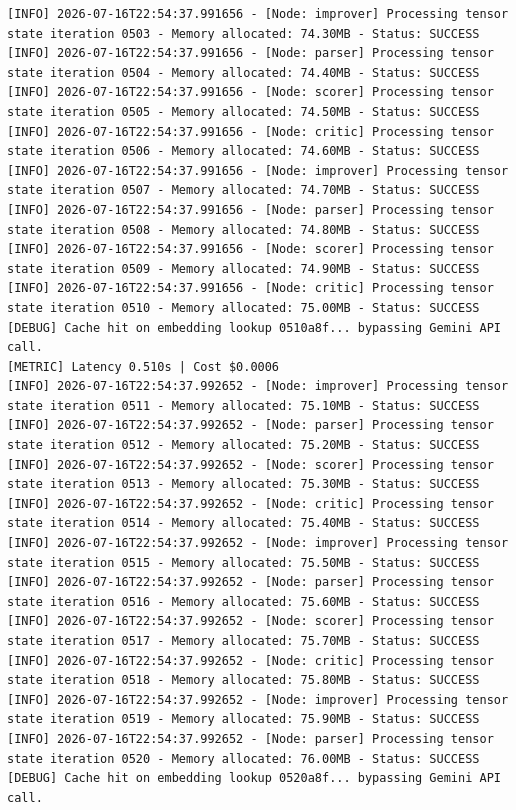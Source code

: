 \documentclass[10pt,journal,compsoc]{IEEEtran}
\begin{document}
\begin{verbatim}
[INFO] 2026-07-16T22:54:37.991656 - [Node: improver] Processing tensor state iteration 0503 - Memory allocated: 74.30MB - Status: SUCCESS
[INFO] 2026-07-16T22:54:37.991656 - [Node: parser] Processing tensor state iteration 0504 - Memory allocated: 74.40MB - Status: SUCCESS
[INFO] 2026-07-16T22:54:37.991656 - [Node: scorer] Processing tensor state iteration 0505 - Memory allocated: 74.50MB - Status: SUCCESS
[INFO] 2026-07-16T22:54:37.991656 - [Node: critic] Processing tensor state iteration 0506 - Memory allocated: 74.60MB - Status: SUCCESS
[INFO] 2026-07-16T22:54:37.991656 - [Node: improver] Processing tensor state iteration 0507 - Memory allocated: 74.70MB - Status: SUCCESS
[INFO] 2026-07-16T22:54:37.991656 - [Node: parser] Processing tensor state iteration 0508 - Memory allocated: 74.80MB - Status: SUCCESS
[INFO] 2026-07-16T22:54:37.991656 - [Node: scorer] Processing tensor state iteration 0509 - Memory allocated: 74.90MB - Status: SUCCESS
[INFO] 2026-07-16T22:54:37.991656 - [Node: critic] Processing tensor state iteration 0510 - Memory allocated: 75.00MB - Status: SUCCESS
[DEBUG] Cache hit on embedding lookup 0510a8f... bypassing Gemini API call.
[METRIC] Latency 0.510s | Cost $0.0006
[INFO] 2026-07-16T22:54:37.992652 - [Node: improver] Processing tensor state iteration 0511 - Memory allocated: 75.10MB - Status: SUCCESS
[INFO] 2026-07-16T22:54:37.992652 - [Node: parser] Processing tensor state iteration 0512 - Memory allocated: 75.20MB - Status: SUCCESS
[INFO] 2026-07-16T22:54:37.992652 - [Node: scorer] Processing tensor state iteration 0513 - Memory allocated: 75.30MB - Status: SUCCESS
[INFO] 2026-07-16T22:54:37.992652 - [Node: critic] Processing tensor state iteration 0514 - Memory allocated: 75.40MB - Status: SUCCESS
[INFO] 2026-07-16T22:54:37.992652 - [Node: improver] Processing tensor state iteration 0515 - Memory allocated: 75.50MB - Status: SUCCESS
[INFO] 2026-07-16T22:54:37.992652 - [Node: parser] Processing tensor state iteration 0516 - Memory allocated: 75.60MB - Status: SUCCESS
[INFO] 2026-07-16T22:54:37.992652 - [Node: scorer] Processing tensor state iteration 0517 - Memory allocated: 75.70MB - Status: SUCCESS
[INFO] 2026-07-16T22:54:37.992652 - [Node: critic] Processing tensor state iteration 0518 - Memory allocated: 75.80MB - Status: SUCCESS
[INFO] 2026-07-16T22:54:37.992652 - [Node: improver] Processing tensor state iteration 0519 - Memory allocated: 75.90MB - Status: SUCCESS
[INFO] 2026-07-16T22:54:37.992652 - [Node: parser] Processing tensor state iteration 0520 - Memory allocated: 76.00MB - Status: SUCCESS
[DEBUG] Cache hit on embedding lookup 0520a8f... bypassing Gemini API call.

\end{verbatim}
\end{document}
